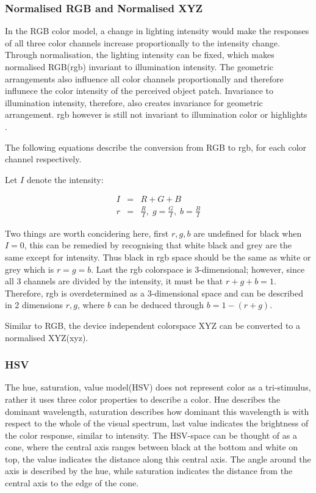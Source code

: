 \documentclass[a4paper,11pt]{article}
\begin{document}
\subsubsection{Normalised RGB and Normalised XYZ}



In the RGB color model, a change in lighting intensity would make the responses of all three color channels increase proportionally to the intensity change. Through normalisation, the lighting intensity can be fixed, which makes normalised RGB(rgb) invariant to illumination intensity. The geometric arrangements also influence all color channels proportionally and therefore influnece the color intensity of the perceived object patch. Invariance to illumination intensity, therefore, also creates invariance for geometric arrangement. rgb however is still not invariant to illumination color or highlights \cite{gevers_invariant}. 



The following equations describe the conversion from RGB to rgb, for each color channel respectively.  

Let $I$ denote the intensity:

\begin{eqnarray}
\label{eq:rgb}
I &=& R+G+B \\
r &=& \frac{R}{I},\; g = \frac{G}{I},\; b = \frac{B}{I}
\end{eqnarray}



Two things are worth concidering here, first $r,g,b$ are undefined for black when $I=0$, this can be remedied by recognising that white black and grey are the same except for intensity. Thus black in rgb space should be the same as white or grey which is $r=g=b$. Last the rgb colorspace is 3-dimensional; however, since all 3 channels are divided by the intensity, it must be that $r+g+b=1$. Therefore, rgb is overdetermined as a 3-dimensional space and can be described in 2 dimensions $r,g$, where $b$ can be deduced through $b=1-(r+g)$.



Similar to RGB, the device independent colorspace XYZ can be converted to a normalised XYZ(xyz).		

		

\subsubsection{HSV}

The hue, saturation, value model(HSV) does not represent color as a tri-stimulus, rather it uses three color properties to describe a color. Hue describes the dominant wavelength, saturation describes how dominant this wavelength is with respect to the whole of the visual spectrum, last value indicates the brightness of the color response, similar to intensity. The HSV-space can be thought of as a cone, where the central axis ranges between black at the bottom and white on top, the value indicates the distance along this central axis. The angle around the axis is described by the hue, while saturation indicates the distance from the central axis to the edge of the cone. 
\end{document}
